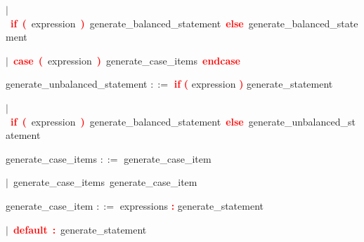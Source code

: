 \mbox{$|$ \textbf{\textcolor{red}{if}} \textbf{\textcolor{red}{(}} expression \textbf{\textcolor{red}{)}} generate\_balanced\_statement \textbf{\textcolor{red}{else}} generate\_balanced\_statement}

\mbox{$|$ \textbf{\textcolor{red}{case}} \textbf{\textcolor{red}{(}} expression \textbf{\textcolor{red}{)}} generate\_case\_items \textbf{\textcolor{red}{endcase}}}

\vspace{1em}
\noindent
\settowidth{\parindent}{\hspace{4ex}}
generate\_unbalanced\_statement $::=$\hspace{1ex} \textbf{\textcolor{red}{if}} \textbf{\textcolor{red}{(}} expression \textbf{\textcolor{red}{)}} generate\_statement

\mbox{$|$ \textbf{\textcolor{red}{if}} \textbf{\textcolor{red}{(}} expression \textbf{\textcolor{red}{)}} generate\_balanced\_statement \textbf{\textcolor{red}{else}} generate\_unbalanced\_statement}

\vspace{1em}
\noindent
\settowidth{\parindent}{\hspace{4ex}}
generate\_case\_items $::=$\hspace{1ex} generate\_case\_item

\mbox{$|$ generate\_case\_items generate\_case\_item}

\vspace{1em}
\noindent
\settowidth{\parindent}{\hspace{4ex}}
generate\_case\_item $::=$\hspace{1ex} expressions \textbf{\textcolor{red}{:}} generate\_statement

\mbox{$|$ \textbf{\textcolor{red}{default}} \textbf{\textcolor{red}{:}} generate\_statement}
